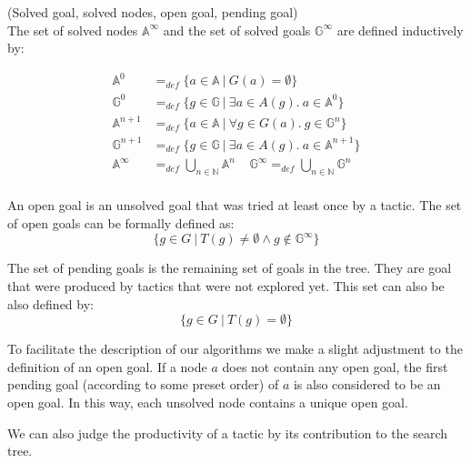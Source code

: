 \documentclass[runningheads,a4paper,draft]{svjour3}
\begin{document}
\begin{definition}\label{def:solved}(Solved goal, solved nodes, open goal,
pending goal)\\
The set of solved nodes $\mathbb{A}^\infty$ and
the set of solved goals $\mathbb{G}^\infty$ are defined inductively by:

\begin{align*}
\mathbb{A}^{0} &=_{def}
\lbrace a \in \mathbb{A}\ |\ G(a) = \emptyset \rbrace \\
\mathbb{G}^{0} &=_{def} \lbrace g \in \mathbb{G}\ |\
\exists a \in A(g).\ a \in \mathbb{A}^{0} \rbrace\\
\mathbb{A}^{n+1} &=_{def} \lbrace a \in \mathbb{A}\ |\
\forall g \in G(a).\ g \in \mathbb{G}^{n} \rbrace\\
\mathbb{G}^{n+1} &=_{def} \lbrace g \in \mathbb{G}\ |\
\exists a \in A(g).\ a \in \mathbb{A}^{n+1} \rbrace \\
\mathbb{A}^\infty &=_{def} \bigcup_{n \in \mathbb{N}} \mathbb{A}^n \ \ \ \ \
\mathbb{G}^\infty =_{def} \bigcup_{n \in \mathbb{N}} \mathbb{G}^n\\
\end{align*}

An open goal is an unsolved goal that was tried at least once by a tactic. The
set of open goals can be formally defined as:
\[\lbrace g \in G\ |\  T(g) \neq \emptyset \wedge g \notin \mathbb{G}^\infty
\rbrace\]

The set of pending goals is the remaining set of goals in the tree. They are
goal that were produced by tactics that were not explored yet. This set can
also be also defined by:
\[\lbrace g \in G\ |\  T(g) = \emptyset \rbrace\]

To facilitate the description  of our algorithms we make a slight adjustment
to the definition of an open goal. If a node $a$ does not contain any open
goal, the first pending goal (according
to some preset order) of $a$ is also considered to be an open goal. In this
way, each unsolved node contains a unique open goal.
\end{definition}


We can also judge the productivity of a tactic by its contribution to the
search
tree.
\end{document}
